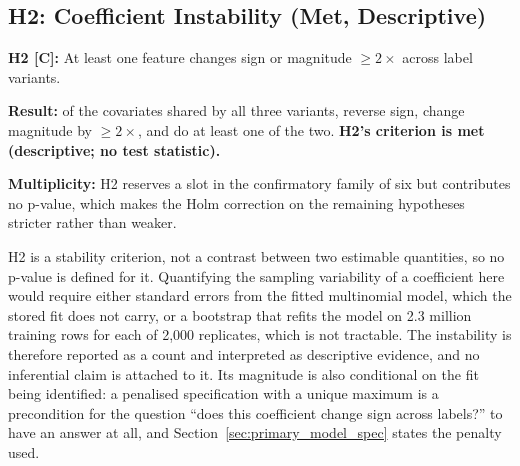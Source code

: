 \subsection{H2: Coefficient Instability (Met, Descriptive)}
\label{sec:h2}

\begin{mdframed}[backgroundcolor=ATUSand!30, linecolor=ATUGreen]
    \textbf{H2 [C]:} At least one feature changes sign or magnitude
    $\geq 2\times$ across label variants.

    \textbf{Result:} of the \pcHTwoNTerms{} covariates shared by all three
    variants, \pcHTwoNSign{} reverse sign, \pcHTwoNMag{} change magnitude by
    $\geq 2\times$, and \pcHTwoEst{} do at least one of the two.
    \textbf{H2's criterion is met (descriptive; no test statistic).}

    \textbf{Multiplicity:} H2 reserves a slot in the confirmatory family of six
    but contributes no p-value, which makes the Holm correction on the
    remaining hypotheses stricter rather than weaker.
\end{mdframed}

H2 is a stability criterion, not a contrast between two estimable quantities,
so no p-value is defined for it. Quantifying the sampling variability of a
coefficient here would require either standard errors from the fitted
multinomial model, which the stored fit does not carry, or a bootstrap that
refits the model on 2.3 million training rows for each of 2,000 replicates,
which is not tractable. The instability is therefore reported as a count and
interpreted as descriptive evidence, and no inferential claim is attached to
it. Its magnitude is also conditional on the fit being identified: a penalised
specification with a unique maximum is a precondition for the question
``does this coefficient change sign across labels?'' to have an answer at all,
and Section~\ref{sec:primary_model_spec} states the penalty used.

